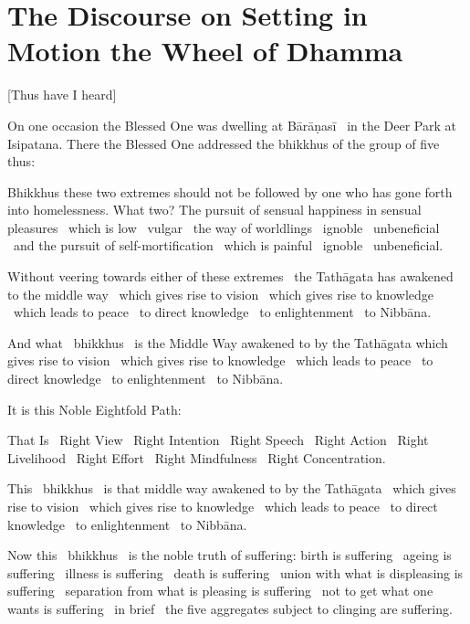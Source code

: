 \section{The Discourse on Setting in Motion the Wheel of Dhamma}
\label{wheel-of-dhamma-full}

[Thus have I heard]

On one occasion the Blessed One was dwelling at Bārāṇasī \breathmark\ in the Deer Park at Isipatana. There the Blessed One addressed the bhikkhus of the group of five thus:

Bhikkhus these two extremes should not be followed by one who has gone forth into homelessness. What two? The pursuit of sensual happiness in sensual pleasures \breathmark\ which is low \breathmark\ vulgar \breathmark\ the way of worldlings \breathmark\ ignoble \breathmark\ unbeneficial \breathmark\ and the pursuit of self-mortification \breathmark\ which is painful \breathmark\ ignoble \breathmark\ unbeneficial.

Without veering towards either of these extremes \breathmark\ the Tathāgata has awakened to the middle way \breathmark\ which gives rise to vision \breathmark\ which gives rise to knowledge \breathmark\ which leads to peace \breathmark\ to direct knowledge \breathmark\ to enlightenment \breathmark\ to Nibbāna.

And what \breathmark\ bhikkhus \breathmark\ is the Middle Way awakened to by the Tathāgata which gives rise to vision \breathmark\ which gives rise to knowledge \breathmark\ which leads to peace \breathmark\ to direct knowledge \breathmark\ to enlightenment \breathmark\ to Nibbāna.

It is this Noble Eightfold Path:

That Is \breathmark\ Right View \breathmark\ Right Intention \breathmark\ Right Speech \breathmark\ Right Action \breathmark\ Right Livelihood \breathmark\ Right Effort \breathmark\ Right Mindfulness \breathmark\ Right Concentration.

This \breathmark\ bhikkhus \breathmark\ is that middle way awakened to by the Tathāgata \breathmark\ which gives rise to vision \breathmark\ which gives rise to knowledge \breathmark\ which leads to peace \breathmark\ to direct knowledge \breathmark\ to enlightenment \breathmark\ to Nibbāna.

Now this \breathmark\ bhikkhus \breathmark\ is the noble truth of suffering: birth is suffering \breathmark\ ageing is suffering \breathmark\ illness is suffering \breathmark\ death is suffering \breathmark\ union with what is displeasing is suffering \breathmark\ separation from what is pleasing is suffering \breathmark\ not to get what one wants is suffering \breathmark\ in brief \breathmark\ the five aggregates subject to clinging are suffering.

